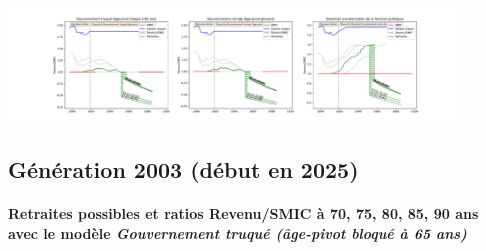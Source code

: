  \begin{center}\includegraphics[width=0.9\textwidth]{fig/ATSEM_1990_22_dest_retraite.pdf}\end{center} \label{fig/ATSEM_1990_22_dest_retraite.pdf} 

\newpage 
 
\subsection{Génération 2003 (début en 2025)} 

\paragraph{Retraites possibles et ratios Revenu/SMIC à 70, 75, 80, 85, 90 ans avec le modèle \emph{Gouvernement truqué (âge-pivot bloqué à 65 ans)}}  
 
